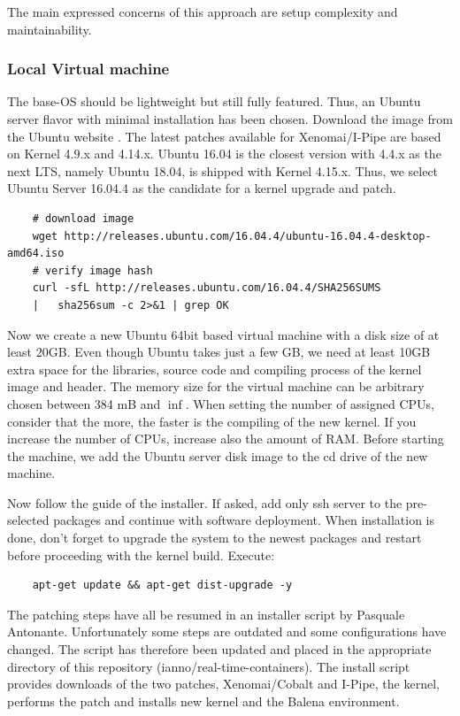 \documentclass[]{scrartcl}
\begin{document}
The main expressed concerns of this approach are setup complexity and maintainability.

\subsubsection{Local Virtual machine}
\label{sec:xenoinst}

The base-OS should be lightweight but still fully featured. Thus, an Ubuntu server flavor with minimal installation has been chosen. Download the image from the Ubuntu website \cite{ubuntu02}. The latest patches available for Xenomai/I-Pipe are based on Kernel 4.9.x and 4.14.x. Ubuntu 16.04 is the closest version with 4.4.x as the next LTS, namely Ubuntu 18.04, is shipped with Kernel 4.15.x. Thus, we select Ubuntu Server 16.04.4 as the candidate for a kernel upgrade and patch.

\begin{verbatim}
	# download image
	wget http://releases.ubuntu.com/16.04.4/ubuntu-16.04.4-desktop-amd64.iso
	# verify image hash
	curl -sfL http://releases.ubuntu.com/16.04.4/SHA256SUMS
	|	sha256sum -c 2>&1 | grep OK
\end{verbatim}

Now we create a new Ubuntu 64bit based virtual machine with a disk size of at least 20GB. Even though Ubuntu takes just a few GB, we need at least 10GB extra space for the libraries, source code and compiling process of the kernel image and header. 
The memory size for the virtual machine can be arbitrary chosen between 384 mB and $\inf$. When setting the number of assigned CPUs, consider that the more, the faster is the compiling of the new kernel. If you increase the number of CPUs, increase also the amount of RAM.
Before starting the machine, we add the Ubuntu server disk image to the cd drive of the new machine.

Now follow the guide of the installer. If asked, add only ssh server to the pre-selected packages and continue with software deployment. When installation is done, don't forget to upgrade the system to the newest packages and restart before proceeding with the kernel build. Execute:

\begin{verbatim}
	apt-get update && apt-get dist-upgrade -y
\end{verbatim}

The patching steps have all be resumed in an installer script by Pasquale Antonante. Unfortunately some steps are outdated and some configurations have changed. The script has therefore been updated and placed in the appropriate directory of this repository (ianno/real-time-containers). The install script provides downloads of the two patches, Xenomai/Cobalt and I-Pipe, the kernel, performs the patch and installs new kernel and the Balena environment.
\end{document}
